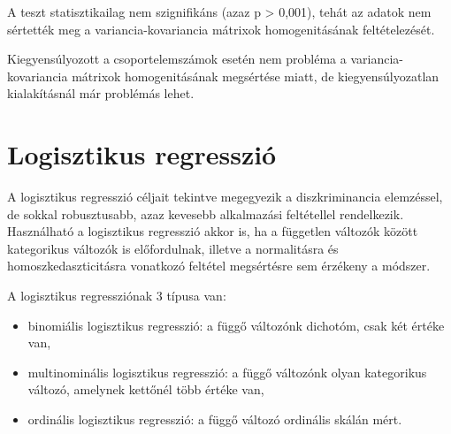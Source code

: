 \documentclass[
  letterpaper,
]{krantz}
\makeatletter
\newenvironment{Shaded}{\begin{snugshade}}{\end{snugshade}}
\newcommand{\AttributeTok}[1]{\textcolor[rgb]{0.40,0.45,0.13}{#1}}
\newcommand{\CommentTok}[1]{\textcolor[rgb]{0.37,0.37,0.37}{#1}}
\newcommand{\FunctionTok}[1]{\textcolor[rgb]{0.28,0.35,0.67}{#1}}
\newcommand{\NormalTok}[1]{\textcolor[rgb]{0.00,0.23,0.31}{#1}}
\newcommand{\SpecialCharTok}[1]{\textcolor[rgb]{0.37,0.37,0.37}{#1}}
\newcommand{\StringTok}[1]{\textcolor[rgb]{0.13,0.47,0.30}{#1}}
\providecommand{\tightlist}{%
  \setlength{\itemsep}{0pt}\setlength{\parskip}{0pt}}\usepackage{longtable,booktabs,array}
\newenvironment{kframe}{%
\medskip{}
\setlength{\fboxsep}{.8em}
 \def\at@end@of@kframe{}%
 \ifinner\ifhmode%
  \def\at@end@of@kframe{\end{minipage}}%
  \begin{minipage}{\columnwidth}%
 \fi\fi%
 \def\FrameCommand##1{\hskip\@totalleftmargin \hskip-\fboxsep
 \colorbox{shadecolor}{##1}\hskip-\fboxsep
     \hskip-\linewidth \hskip-\@totalleftmargin \hskip\columnwidth}%
 \MakeFramed {\advance\hsize-\width
   \@totalleftmargin\z@ \linewidth\hsize
   \@setminipage}}%
 {\par\unskip\endMakeFramed%
 \at@end@of@kframe}
\renewenvironment{Shaded}{\begin{kframe}}{\end{kframe}}
\makeatother
\begin{document}
\begin{Shaded}
\end{Shaded}

A teszt statisztikailag nem szignifikáns (azaz p \textgreater{} 0,001),
tehát az adatok nem sértették meg a variancia-kovariancia mátrixok
homogenitásának feltételezését.

Kiegyensúlyozott a csoportelemszámok esetén nem probléma a
variancia-kovariancia mátrixok homogenitásának megsértése miatt, de
kiegyensúlyozatlan kialakításnál már problémás lehet.


\hypertarget{sec-logisztikus-regresszio}{%
\chapter{Logisztikus regresszió}\label{sec-logisztikus-regresszio}}

A logisztikus regresszió céljait tekintve megegyezik a diszkriminancia
elemzéssel, de sokkal robusztusabb, azaz kevesebb alkalmazási
feltétellel rendelkezik. Használható a logisztikus regresszió akkor is,
ha a független változók között kategorikus változók is előfordulnak,
illetve a normalitásra és homoszkedaszticitásra vonatkozó feltétel
megsértésre sem érzékeny a módszer.

A logisztikus regressziónak 3 típusa van:

\begin{itemize}
\tightlist
\item
  binomiális logisztikus regresszió: a függő változónk dichotóm, csak
  két értéke van,
\item
  multinominális logisztikus regresszió: a függő változónk olyan
  kategorikus változó, amelynek kettőnél több értéke van,
\item
  ordinális logisztikus regresszió: a függő változó ordinális skálán
  mért.
\end{itemize}
\end{document}
